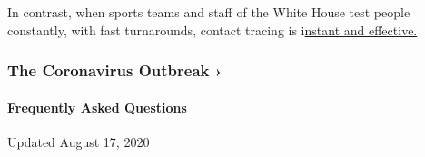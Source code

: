 In contrast, when sports teams and staff of the White House test people
constantly, with fast turnarounds, contact tracing is
i\href{https://www.nbcnews.com/politics/white-house/white-house-executive-office-cafeteria-closed-after-positive-coronavirus-test-n1234662?cid=sm_npd_nn_tw_ma}{nstant
and effective.}

\href{https://www.nytimes3xbfgragh.onion/news-event/coronavirus?action=click\&pgtype=Article\&state=default\&region=MAIN_CONTENT_3\&context=storylines_faq}{}

\hypertarget{the-coronavirus-outbreak-}{%
\subsubsection{The Coronavirus Outbreak
›}\label{the-coronavirus-outbreak-}}

\hypertarget{frequently-asked-questions}{%
\paragraph{Frequently Asked
Questions}\label{frequently-asked-questions}}

Updated August 17, 2020

